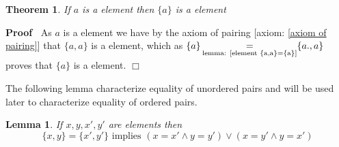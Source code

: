 \documentclass{book}
\newcommand{\equallim}{\mathop{=}\limits}
\newenvironment{proof}{\noindent\textbf{Proof\ }}{\hspace*{\fill}$\Box$\medskip}
\newtheorem{lemma}{Lemma}
\newtheorem{theorem}{Theorem}
\begin{document}
\begin{theorem}
  \label{element: {a} is a element}If $a$ is a element then $\{ a \}$ is a
  element
\end{theorem}

\begin{proof}
  As $a$ is a element we have by the axiom of pairing [axiom: \ref{axiom of
  pairing}] that $\{ a, a \}$ is a element, which as $\{ a \}
  \equallim_{\text{lemma: \ref{element {a,a}={a}}}} \{ a., a \}$ proves that
  $\{ a \}$ is a element.
\end{proof}

The following lemma characterize equality of unordered pairs and will be used
later to characterize equality of ordered pairs.

\begin{lemma}
  \label{element equalitiy of unordered pairs}If $x, y, x', y'$ are elements
  then
  \[ \{ x, y \} = \{ x', y' \} \text{ implies } (x = x' \wedge y = y') \vee
     (x = y' \wedge y = x') \]
\end{lemma}
\end{document}
